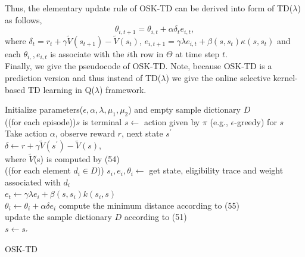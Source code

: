 \documentclass[conference]{IEEEtran}
\makeatletter
\newcommand{\removelatexerror}{\let\@latex@error\@gobble}
\newcommand{\dosemic}{\renewcommand{\@endalgocfline}{\algocf@endline}}%
\let\oldnl\nl%
\newcommand{\nonl}{\renewcommand{\nl}{\let\nl\oldnl}}%
\makeatother
\begin{document}
Thus, the elementary update rule of OSK-TD can be derived into form of TD($\lambda$) as follows,
\begin{equation}
	\theta_{i, t+1} = \theta_{i, t}+\alpha \delta_t e_{i, t},
\end{equation}
where $\delta_t = r_{t}+\gamma \widetilde{V}(s_{t+1})-\widetilde{V}(s_t)$, $e_{i, t+1} = \gamma \lambda e_{i, t}+\beta(s, s_t)\kappa(s,s_t)$ and each $\theta_{i, }, e_{i, t}$ is associate with the $i$th row in $\Theta$ at time step $t$.\\

Finally, we give the pseudocode of OSK-TD. Note, because OSK-TD is a prediction version and thus instead of TD($\lambda$) we give the online selective kernel-based TD learning in Q($\lambda$) framework.\\
{
	\removelatexerror%
	\LinesNumbered
	\begin{algorithm}[H]
		\textup{Initialize parameters($\epsilon, \alpha,\lambda, \mu_1, \mu_2$) and empty sample dictionary $D$}\\

		\Repeat({(for each episode)}){$s$ is terminal}{
	  		$s\leftarrow$ action given by $\pi$ (e.g., $\epsilon$-greedy) for $s$\\
	  		Take action $\alpha$, observe reward $r$, next state $s^{'}$\\
	  		$\delta \leftarrow r+\gamma\widetilde{V}(s^{'})-\widetilde{V}(s)$,\\
	  		\dosemic\nonl where $\widetilde{V}$(s) is computed by (54)\\
  		
  			\Repeat({(for each element $d_i\in D$)}){}{
	  			$s_i, e_i, \theta_i \leftarrow$ get state, eligibility trace and weight associated with $d_i$\\
	  			$e_t\leftarrow \gamma\lambda e_i+\beta(s, s_i)k(s_i, s)$\\
	  			$\theta_i \leftarrow \theta_i + \alpha\delta e_i$
  			}
  			compute the minimum distance according to (55)\\
  			update the sample dictionary $D$ according to (51)\\
  			$s\leftarrow s_{'}$
  		}
 		\caption{OSK-TD}
	\end{algorithm}
}

\end{document}
